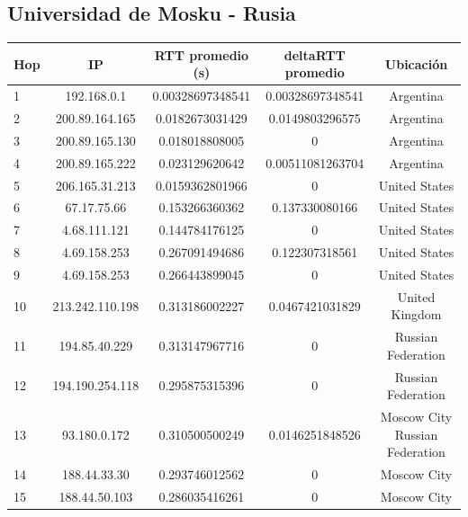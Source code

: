  \subsection{Universidad de Mosku - Rusia}

\bigskip

\begin{tabular}{| l | c | c | c | c |}
 \hline 
Hop & IP &  RTT promedio (s)  & deltaRTT promedio & Ubicación\\
\hline 
1  &  192.168.0.1  &  0.00328697348541    &  0.00328697348541 & Argentina\\
\hline 
2  &  200.89.164.165  &  0.0182673031429    &  0.0149803296575 & Argentina\\
\hline 
3  &  200.89.165.130  &  0.018018808005    &  0 & Argentina\\
\hline 
4  &  200.89.165.222  &  0.023129620642   &  0.00511081263704 & Argentina\\
\hline 
5  &  206.165.31.213  &  0.0159362801966    &  0 & United States\\
\hline 
6  &  67.17.75.66  &  0.153266360362    &  0.137330080166 &  United States\\
\hline 
7  &  4.68.111.121  &  0.144784176125    &  0 & United States\\
\hline 
8  &  4.69.158.253  &  0.267091494686    &  0.122307318561 &  United States\\
\hline 
9  &  4.69.158.253  &  0.266443899045    &  0 & United States\\
\hline 
10  &  213.242.110.198  &  0.313186002227    &  0.0467421031829 & United Kingdom\\
\hline 
11  &  194.85.40.229  &  0.313147967716    &  0 & Russian Federation\\
\hline 
12  &  194.190.254.118  &  0.295875315396    &  0 & Russian Federation\\
\hline 
13  &  93.180.0.172  &  0.310500500249   &  0.0146251848526 & Moscow City Russian Federation\\
\hline 
14  &  188.44.33.30  &  0.293746012562    &  0 & Moscow City\\
\hline 
15  &  188.44.50.103  &  0.286035416261   &  0 & Moscow City\\
\hline 
\end{tabular}

\bigskip

